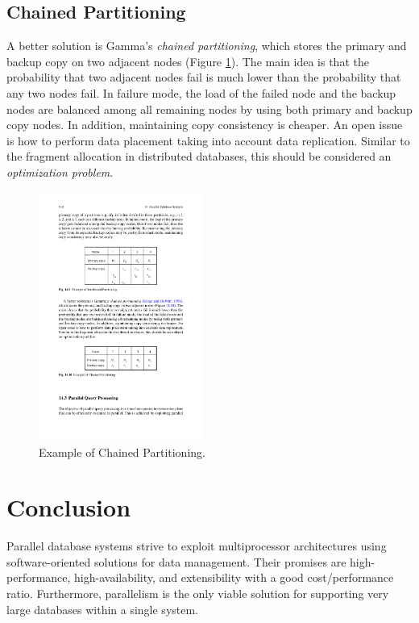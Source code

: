 \documentclass{vldb}
\begin{document}

\subsection{Chained Partitioning}
A better solution is Gamma’s \textit{chained partitioning}, which stores the primary and backup copy on two adjacent nodes (Figure \ref{fig:chained}). The main idea is that the probability that two adjacent nodes fail is much lower than the probability that any two nodes fail. In failure mode, the load of the failed node and the backup nodes are balanced among all remaining nodes by using both primary and backup copy nodes. In addition, maintaining copy consistency is cheaper. An open issue is how to perform data placement taking into account data replication. Similar to the fragment allocation in distributed databases, this should be considered an \textit{optimization problem}.

\begin{figure}[htb]
\centering
\includegraphics[width=0.48\textwidth]{chained}
\caption{Example of Chained Partitioning.}
\label{fig:chained}
\end{figure}

\section{Conclusion}
Parallel database systems strive to exploit multiprocessor architectures using software-oriented solutions for data management. Their promises are high-performance, high-availability, and extensibility with a good cost/performance ratio. Furthermore, parallelism is the only viable solution for supporting very large databases within a single system.
\end{document}
